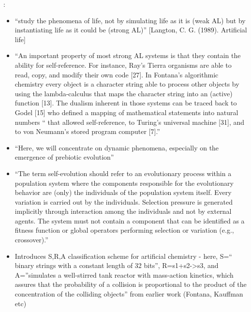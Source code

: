 \autocite{Dittrich1998}:

		\begin{itemize}
			\item
			
			``study the phenomena of life, not by simulating life as it is (weak
			AL) but by instantiating life as it could be (strong AL)'' {[}Langton,
			C. G. (1989). Artificial life{]}
			
			\item
			
			``An important property of most strong AL systems is that they contain
			the ability for self-reference. For instance, Ray's Tierra organisms
			are able to read, copy, and modify their own code {[}27{]}. In
			Fontana's algorithmic chemistry every object is a character string
			able to process other objects by using the lambda-calculus that maps
			the character string into an (active) function {[}13{]}. The dualism
			inherent in those systems can be traced back to Godel {[}15{]} who
			defined a mapping of mathematical statements into natural numbers ``
			that allowed self-reference, to Turing's universal machine {[}31{]},
			and to von Neumann's stored program computer {[}7{]}.''
			
			\item
			
			``Here, we will concentrate on dynamic phenomena, especially on the
			emergence of prebiotic evolution''
			
			\item
			
			``The term self-evolution should refer to an evolutionary process
			within a population system where the components responsible for the
			evolutionary behavior are (only) the individuals of the population
			system itself. Every variation is carried out by the individuals.
			Selection pressure is generated implicitly through interaction among
			the individuals and not by external agents. The system must not
			contain a component that can be identified as a fitness function or
			global operators performing selection or variation (e.g.,
			crossover).''
			
			\item
			
			Introduces S,R,A classification scheme for artificial chemistry -
			here, S=`` binary strings with a constant length of 32 bits'',
			R=s1+s2-\textgreater{}s3, and A=''simulates a well-stirred tank
			reactor with mass-action kinetics, which assures that the probability
			of a collision is proportional to the product of the concentration of
			the colliding objects'' from earlier work (Fontana, Kauffman etc)
			

\end{itemize}
